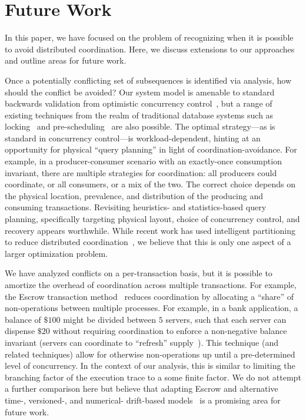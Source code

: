 
\section{Future Work}
\label{sec:discussion}

In this paper, we have focused on the problem of recognizing when it
is possible to avoid distributed coordination. Here, we discuss
extensions to our approaches and outline areas for future work.

 Once a potentially conflicting set of
subsequences is identified via \iconfluence analysis, how should the
conflict be avoided? Our system model is amenable to standard
backwards validation from optimistic concurrency
control~\cite{bernstein-book}, but a range of existing techniques from
the realm of traditional database systems such as
locking~\cite{gray-virtues} and pre-scheduling~\cite{calvin} are also
possible. The optimal strategy---as is standard in concurrency
control---is workload-dependent, hinting at an opportunity for
physical ``query planning'' in light of coordination-avoidance. For
example, in a producer-consumer scenario with an exactly-once
consumption invariant, there are multiple strategies for coordination:
all producers could coordinate, or all consumers, or a mix of the
two. The correct choice depends on the physical location, prevalence,
and distribution of the producing and consuming
transactions. Revisiting heuristics- and statistics-based query
planning, specifically targeting physical layout, choice of
concurrency control, and recovery appears worthwhile. While recent
work has used intelligent partitioning to reduce distributed
coordination~\cite{schism}, we believe that this is only one aspect of
a larger optimization problem.

 We have analyzed conflicts on a
per-transaction basis, but it is possible to amortize the overhead of
coordination across multiple transactions. For example, the Escrow
transaction method~\cite{escrow} reduces coordination by allocating a
``share'' of non-\iconfluent operations between multiple
processes. For example, in a bank application, a balance of $\$100$
might be divided between $5$ servers, such that each server can
dispense $\$20$ without requiring coordination to enforce a
non-negative balance invariant (servers can coordinate to ``refresh''
supply~\cite{mdcc}). This technique (and related techniques) allow
\cfreedom for otherwise non-\iconfluent operations up until a
pre-determined level of concurrency. In the context of our \cfreedom
analysis, this is similar to limiting the branching factor of the
execution trace to a some finite factor. We do not attempt a further
comparison here but believe that adapting Escrow and alternative
time-, versioned-, and numerical- drift-based models~\cite{yu-conit}
is a promising area for future work.


